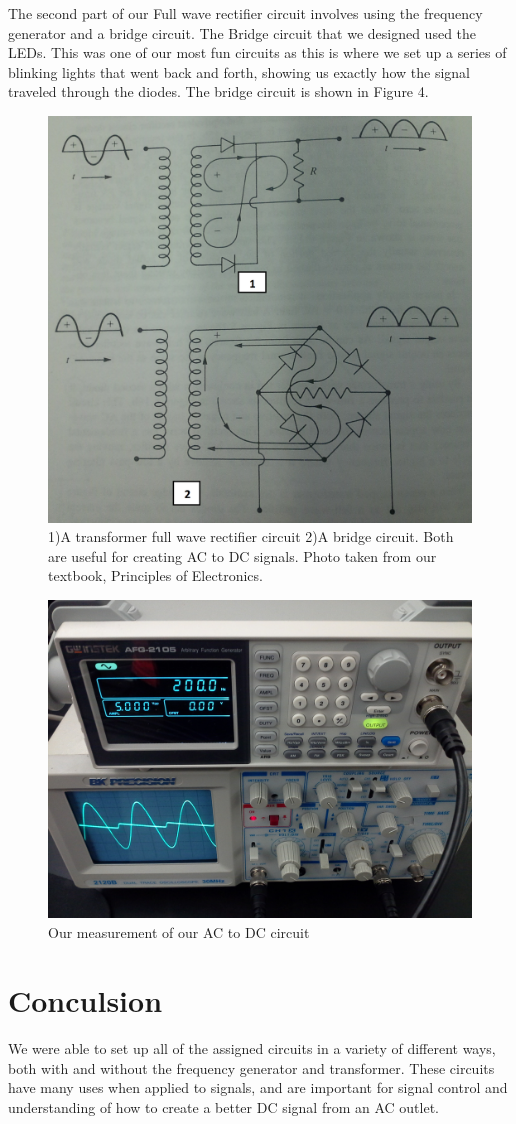 \documentclass[a4paper]{article}
\begin{document}
The second part of our Full wave rectifier circuit involves using the frequency generator and a bridge circuit.  The Bridge circuit that we designed used the LEDs.  This was one of our most fun circuits as this is where we set up a series of blinking lights that went back and forth, showing us  exactly how the signal traveled through the diodes.  The bridge circuit is shown in Figure 4.

\begin{figure}
\centering
\includegraphics[width=.65\textwidth]{Rectifier_circuits.png}
\caption{\label{fig:Rect} 1)A transformer full wave rectifier circuit 2)A bridge circuit.  Both are useful for creating AC to DC signals.  Photo taken from our textbook, Principles of Electronics.}
\end{figure}

\begin{figure}
\centering
\includegraphics[width=.5\textwidth]{ACDC.jpg}
\caption{\label{fig:RectMeasured}Our measurement of our AC to DC circuit}
\end{figure}

\section{Conculsion}

We were able to set up all of the assigned circuits in a variety of different ways, both with and without the frequency generator and transformer.  These circuits have many uses when applied to signals, and are important for signal control and understanding of how to create a better DC signal from an AC outlet.  
\end{document}
